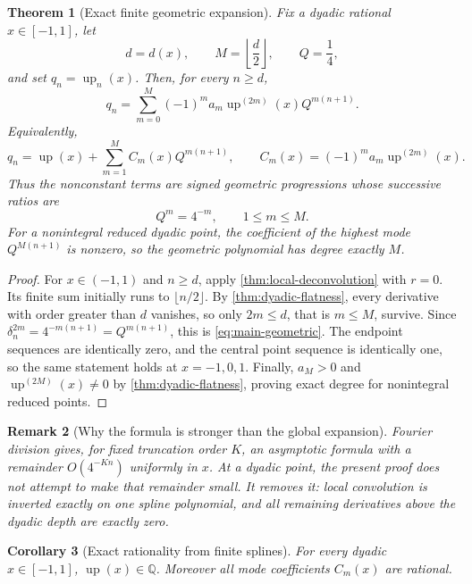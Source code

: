 \documentclass[11pt]{article}
\newtheorem{theorem}{Theorem}[section]
\newtheorem{corollary}[theorem]{Corollary}
\newtheorem{remark}[theorem]{Remark}
\newcommand{\upf}{\operatorname{up}}
\begin{document}
\begin{theorem}[Exact finite geometric expansion]\label{thm:main-geometric}
Fix a dyadic rational \(x\in[-1,1]\), let
\[
 d=d(x),\qquad M=\left\lfloor\frac d2\right\rfloor,
 \qquad Q=\frac14,
\]
and set \(q_n=\upf_n(x)\).  Then, for every \(n\ge d\),
\begin{equation}\label{eq:main-geometric}
 \boxed{\displaystyle
 q_n=\sum_{m=0}^{M}(-1)^m a_m\upf^{(2m)}(x)Q^{m(n+1)}.}
\end{equation}
Equivalently,
\begin{equation}\label{eq:constant-plus-modes}
 q_n=\upf(x)+\sum_{m=1}^{M}C_m(x)Q^{m(n+1)},
 \qquad
 C_m(x)=(-1)^m a_m\upf^{(2m)}(x).
\end{equation}
Thus the nonconstant terms are signed geometric progressions whose successive
ratios are
\[
 Q^m=4^{-m},\qquad 1\le m\le M.
\]
For a nonintegral reduced dyadic point, the coefficient of the highest mode
\(Q^{M(n+1)}\) is nonzero, so the geometric polynomial has degree exactly
\(M\).
\end{theorem}

\begin{proof}
For \(x\in(-1,1)\) and \(n\ge d\), apply
\cref{thm:local-deconvolution} with \(r=0\).  Its finite sum initially runs to
\(\lfloor n/2\rfloor\).  By \cref{thm:dyadic-flatness}, every derivative with
order greater than \(d\) vanishes, so only \(2m\le d\), that is
\(m\le M\), survive.  Since \(\delta_n^{2m}=4^{-m(n+1)}=Q^{m(n+1)}\), this is
\cref{eq:main-geometric}.  The endpoint sequences are identically zero, and
the central point sequence is identically one, so the same statement holds at
\(x=-1,0,1\).  Finally, \(a_M>0\) and
\(\upf^{(2M)}(x)\ne0\) by \cref{thm:dyadic-flatness}, proving exact degree for
nonintegral reduced points.
\end{proof}

\begin{remark}[Why the formula is stronger than the global expansion]
Fourier division gives, for fixed truncation order \(K\), an asymptotic formula
with a remainder \(O(4^{-K n})\) uniformly in \(x\).  At a dyadic point, the
present proof does not attempt to make that remainder small.  It removes it:
local convolution is inverted exactly on one spline polynomial, and all
remaining derivatives above the dyadic depth are exactly zero.
\end{remark}

\begin{corollary}[Exact rationality from finite splines]\label{cor:rationality}
For every dyadic \(x\in[-1,1]\), \(\upf(x)\in\mathbb{Q}\).  Moreover all mode
coefficients \(C_m(x)\) are rational.
\end{corollary}
\end{document}
